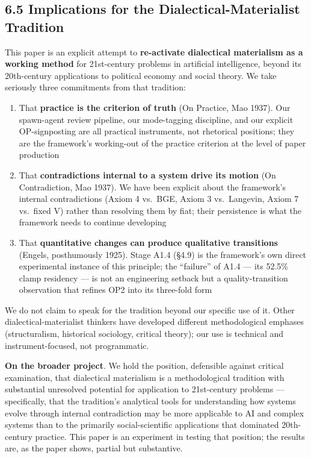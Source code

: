 \documentclass[
]{article}
\providecommand{\tightlist}{%
  \setlength{\itemsep}{0pt}\setlength{\parskip}{0pt}}
\begin{document}
\hypertarget{implications-for-the-dialectical-materialist-tradition}{%
\subsection{6.5 Implications for the Dialectical-Materialist
Tradition}\label{implications-for-the-dialectical-materialist-tradition}}

This paper is an explicit attempt to \textbf{re-activate dialectical
materialism as a working method} for 21st-century problems in artificial
intelligence, beyond its 20th-century applications to political economy
and social theory. We take seriously three commitments from that
tradition:

\begin{enumerate}
\def\labelenumi{\arabic{enumi}.}
\tightlist
\item
  That \textbf{practice is the criterion of truth} (On Practice, Mao
  1937). Our spawn-agent review pipeline, our mode-tagging discipline,
  and our explicit OP-signposting are all practical instruments, not
  rhetorical positions; they are the framework's working-out of the
  practice criterion at the level of paper production
\item
  That \textbf{contradictions internal to a system drive its motion} (On
  Contradiction, Mao 1937). We have been explicit about the framework's
  internal contradictions (Axiom 4 vs.~BGE, Axiom 3 vs.~Langevin, Axiom
  7 vs.~fixed V) rather than resolving them by fiat; their persistence
  is what the framework needs to continue developing
\item
  That \textbf{quantitative changes can produce qualitative transitions}
  (Engels, posthumously 1925). Stage A1.4 (§4.9) is the framework's own
  direct experimental instance of this principle; the ``failure'' of
  A1.4 --- its 52.5\% clamp residency --- is not an engineering setback
  but a quality-transition observation that refines OP2 into its
  three-fold form
\end{enumerate}

We do not claim to speak for the tradition beyond our specific use of
it. Other dialectical-materialist thinkers have developed different
methodological emphases (structuralism, historical sociology, critical
theory); our use is technical and instrument-focused, not programmatic.

\textbf{On the broader project}. We hold the position, defensible
against critical examination, that dialectical materialism is a
methodological tradition with substantial unresolved potential for
application to 21st-century problems --- specifically, that the
tradition's analytical tools for understanding how systems evolve
through internal contradiction may be more applicable to AI and complex
systems than to the primarily social-scientific applications that
dominated 20th-century practice. This paper is an experiment in testing
that position; the results are, as the paper shows, partial but
substantive.
\end{document}
